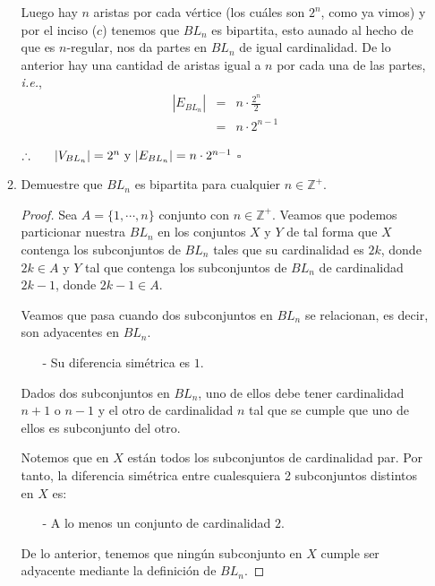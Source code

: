 \documentclass{article}
\begin{document}
\begin{enumerate}
\begin{enumerate}
    Luego hay $n$ aristas por cada vértice (los cuáles son
    $2^n$, como ya vimos) y por el inciso ($c$) tenemos que
    $BL_n$ es bipartita, esto aunado al hecho de que es
    $n$-regular, nos da partes en $BL_n$ de igual
    cardinalidad. De lo anterior hay una cantidad de aristas
    igual a $n$ por cada una de las partes, \textit{i.e.},
    \begin{eqnarray*}
      |E_{BL_n}| &=& n \cdot \frac{2^n}{2}\\
      &=& n \cdot 2^{n - 1}
    \end{eqnarray*}

        
    \hspace*{4 cm} $\therefore\ \ \ \ \ \abs{V_{BL_n}} = 2^n
    \text{ y } |E_{BL_n}| = n \cdot 2^{n -1}$
    \hfill $\square$
    
    
  \item Demuestre que $BL_n$ es bipartita para cualquier $n \in \mathbb{Z}^+$. 
    
    \begin{proof}
      
      Sea $A = \{1, \dotsm,n\}$ conjunto con $n \in \mathbb{Z}^+$.     
      Veamos que podemos particionar nuestra $BL_n$ en los conjuntos
      $X$ y $Y$ de tal forma que $X$ contenga los subconjuntos de
      $BL_n$ tales que su cardinalidad es $2k$, donde $2k \in A$  y
      $Y$ tal que contenga los subconjuntos de $BL_n$ de cardinalidad
      $2k -1$, donde $2k -1 \in A$.
      
      Veamos que pasa cuando dos subconjuntos en $BL_n$ se relacionan,
      es decir, son adyacentes en $BL_n$.
      \begin{itemize}
      \item[-] Su diferencia simétrica es $1$.
      \end{itemize}
      Dados dos subconjuntos en $BL_n$, uno de ellos debe tener cardinalidad
      $n+1$ o $n-1$ y el otro de cardinalidad $n$ tal que se cumple que uno
      de ellos es subconjunto del otro.
      
      Notemos que en $X$ están todos los subconjuntos de cardinalidad par.
      Por tanto, la diferencia simétrica entre cualesquiera 2 subconjuntos
      distintos en $X$ es:
      \begin{itemize}
      \item[-] A lo menos un conjunto de cardinalidad $2$.
      \end{itemize}
      De lo anterior, tenemos que ningún subconjunto en
      $X$ cumple ser adyacente mediante la definición de $BL_n$.
      

\end{proof}
\end{enumerate}
\end{enumerate}
\end{document}
